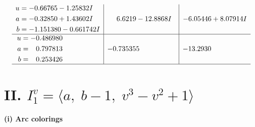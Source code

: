 \documentclass[1p]{elsarticle_modified}
\theoremstyle{definition}
\begin{document}
$$\begin{array}{c|c|c}
\begin{aligned}
u &= -0.66765 - 1.25832 I \\
a &= -0.32850 + 1.43602 I \\
b &= -1.151380 - 0.661742 I\end{aligned}
 & \phantom{-}6.6219 - 12.8868 I & -6.05446 + 8.07914 I \\ \hline\begin{aligned}
u &= -0.486980\phantom{ +0.000000I} \\
a &= \phantom{-}0.797813\phantom{ +0.000000I} \\
b &= \phantom{-}0.253426\phantom{ +0.000000I}\end{aligned}
 & -0.735355\phantom{ +0.000000I} & -13.2930\phantom{ +0.000000I}\\
 \hline 
 \end{array}$$\newpage\newpage\renewcommand{\arraystretch}{1}
\centering \section*{II. $I^v_{1}= \langle a,\;b-1,\;v^3- v^2+1 \rangle$}
\flushleft \textbf{(i) Arc colorings}\\
\end{document}
